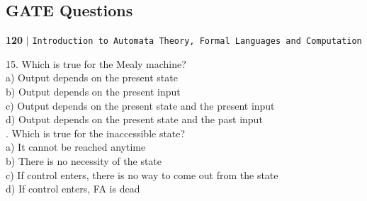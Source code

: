 \documentclass[a4,9pt]{beamer}
\begin{document}
\begin{frame}
\section*{GATE Questions}
\begin{flushleft}
    \textbf{120}\hspace*{0.1cm} \textbf{$|$} \hspace*{0.1cm} \texttt{Introduction to Automata Theory, Formal Languages and Computation}
  \end{flushleft}

\vspace*{0.3cm}
15. Which is true for the Mealy machine?\\
\hspace*{0.5cm} a) Output depends on the present state \\
\hspace*{0.5cm} b) Output depends on the present input \\
\hspace*{0.5cm} c) Output depends on the present state and the present input\\
\hspace*{0.5cm} d) Output depends on the present state and the past input\\

\vspace*{0.2cm}
. Which is true for the inaccessible state?\\
\hspace*{0.5cm} a) It cannot be reached anytime \\
\hspace*{0.5cm} b) There is no necessity of the state \\
\hspace*{0.5cm} c) If control enters, there is no way to come out from the state \\
\hspace*{0.5cm} d) If control enters, FA is dead \\

\vspace*{0.2cm}
\end{frame}
\end{document}
